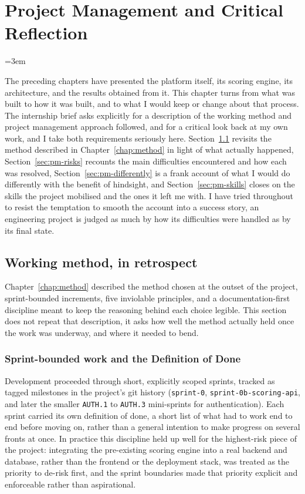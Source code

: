 \chapter{Project Management and Critical Reflection}
\label{chap:pm}
\emergencystretch=3em\relax

The preceding chapters have presented the platform itself, its scoring engine, its architecture, and the results obtained from it. This chapter turns from what was built to how it was built, and to what I would keep or change about that process. The internship brief asks explicitly for a description of the working method and project management approach followed, and for a critical look back at my own work, and I take both requirements seriously here. Section~\ref{sec:pm-working-method} revisits the method described in Chapter~\ref{chap:method} in light of what actually happened, Section~\ref{sec:pm-risks} recounts the main difficulties encountered and how each was resolved, Section~\ref{sec:pm-differently} is a frank account of what I would do differently with the benefit of hindsight, and Section~\ref{sec:pm-skills} closes on the skills the project mobilised and the ones it left me with. I have tried throughout to resist the temptation to smooth the account into a success story, an engineering project is judged as much by how its difficulties were handled as by its final state.

\section{Working method, in retrospect}
\label{sec:pm-working-method}

Chapter~\ref{chap:method} described the method chosen at the outset of the project, sprint-bounded increments, five inviolable principles, and a documentation-first discipline meant to keep the reasoning behind each choice legible. This section does not repeat that description, it asks how well the method actually held once the work was underway, and where it needed to bend.

\subsection{Sprint-bounded work and the Definition of Done}
\label{sec:pm-sprints}

Development proceeded through short, explicitly scoped sprints, tracked as tagged milestones in the project's git history (\texttt{sprint-0}, \texttt{sprint-0b-scoring-api}, and later the smaller \texttt{AUTH.1} to \texttt{AUTH.3} mini-sprints for authentication). Each sprint carried its own definition of done, a short list of what had to work end to end before moving on, rather than a general intention to make progress on several fronts at once. In practice this discipline held up well for the highest-risk piece of the project: integrating the pre-existing scoring engine into a real backend and database, rather than the frontend or the deployment stack, was treated as the priority to de-risk first, and the sprint boundaries made that priority explicit and enforceable rather than aspirational.

